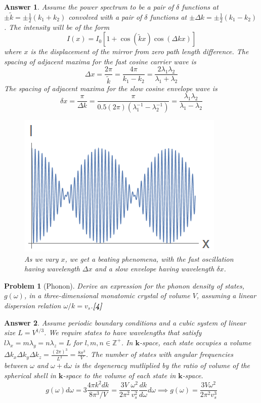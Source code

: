 \documentclass[a4paper]{article}
\newtheorem{ans}{Answer}[subsection]
\theoremstyle{new}
\newtheorem{qns}{Problem}[subsection]
\begin{document}
\begin{ans}
Assume the power spectrum to be a pair of $\delta$ functions at $\pm\tilde{k}=\pm\frac{1}{2}(k_1+k_2)$ convolved with a pair of $\delta$ functions at $\pm\Delta k=\pm\frac{1}{2}(k_1-k_2)$. The intensity will be of the form
$$I(x)=I_0[1+\cos(\tilde{k}x)\cos(\Delta kx)]$$
where $x$ is the displacement of the mirror from zero path length difference. The spacing of adjacent maxima for the fast cosine carrier wave is
$$\Delta x=\frac{2\pi}{\tilde{k}}=\frac{4\pi}{k_1-k_2}=\frac{2\lambda_1\lambda_2}{\lambda_1+\lambda_2}$$
The spacing of adjacent maxima for the slow cosine envelope wave is 
$$\delta x=\frac{\pi}{\Delta k}=\frac{\pi}{0.5(2\pi)(\lambda_1^{-1}-\lambda_2^{-1})}=\frac{\lambda_1\lambda_2}{\lambda_1-\lambda_2}$$
\begin{figure}[H]
    \centering
    \includegraphics[scale=0.75]{2018P2B8ii.PNG}
    \caption{As we vary $x$, we get a beating phenomena, with the fast oscillation having wavelength $\Delta x$ and a slow envelope having wavelength $\delta x$.}
\end{figure}
\end{ans}
\begin{qns}[Phonon]
Derive an expression for the phonon density of states, $g(\omega)$, in a three-dimensional monatomic crystal of volume $V$, assuming a linear dispersion relation $\omega/k=v_s$.\hfill\textbf{[4]}
\end{qns}
\begin{ans}
Assume periodic boundary conditions and a cubic system of linear size $L=V^{1/3}$. We require states to have wavelengths that satisfy $l\lambda_x=m\lambda_y=n\lambda_z=L$ for $l,m,n\in\mathbb{Z}^+$. In $\mathbf{k}$-space, each state occupies a volume $\Delta k_x\Delta k_y\Delta k_z=\frac{(2\pi)^3}{L^3}=\frac{8\pi^3}{V}$. The number of states with angular frequencies between $\omega$ and $\omega+d\omega$ is the degeneracy mutliplied by the ratio of volume of the spherical shell in $\mathbf{k}$-space to the volume of each state in $\mathbf{k}$-space.
$$g(\omega)d\omega=3\frac{4\pi k^2dk}{8\pi^3/V}=\frac{3V}{2\pi^2}\frac{\omega^2}{v_s^2}\frac{dk}{d\omega}d\omega\implies g(\omega)=\frac{3V\omega^2}{2\pi^2v_s^3}$$
\end{ans}
\end{document}
